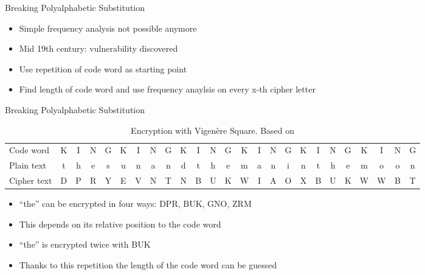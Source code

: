 \documentclass[]{beamer}
\begin{document}
\begin{frame}{Breaking Polyalphabetic Substitution}
	\begin{itemize}
		\item<1-> Simple frequency analysis not possible anymore
		\item<2-> Mid 19th century: vulnerability discovered
		\item<3-> Use repetition of code word as starting point
		\item<4-> Find length of code word and use frequency anaylsis on every x-th cipher letter
	\end{itemize}
\end{frame}

\begin{frame}{Breaking Polyalphabetic Substitution}
	\begin{table}
		\centering
		\resizebox{10.5cm}{!} {
			\begin{tabular}{l c c c c c c c c c c c c c c c c c c c c c c c c}
				\hline
				Code word &K&I&N&G&K&I&N&G&K&I&N&G&K&I&N&G&K&I&N&G&K&I&N&G\\
				Plain text &t&h&e&s&u&n&a&n&d&t&h&e&m&a&n&i&n&t&h&e&m&o&o&n \\
				Cipher text &D&P&R&Y&E&V&N&T&N&B&U&K&W&I&A&O&X&B&U&K&W&W&B&T\\
				\hline
			\end{tabular}
		}
		\caption{Encryption with Vigenère Square. Based on \cite{singh1999}}
	\end{table}
	\begin{itemize}
		\item<2-> ``the'' can be encrypted in four ways: DPR, BUK, GNO, ZRM
		\item<4-> This depends on its relative position to the code word
		\item<5-> ``the'' is encrypted twice with BUK
		\item<6-> Thanks to this repetition the length of the code word can be guessed
	\end{itemize}
\end{frame}
\end{document}
